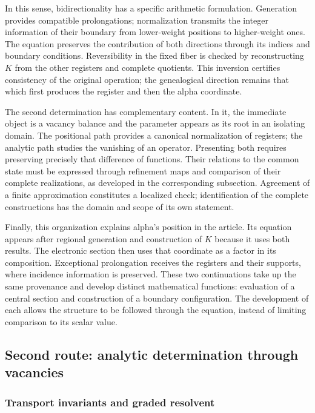 In this sense, bidirectionality has a specific arithmetic
formulation. Generation provides compatible prolongations;
normalization transmits the integer information of their boundary from
lower-weight positions to higher-weight ones. The equation preserves the
contribution of both directions through its indices and boundary
conditions. Reversibility in the fixed fiber is checked by reconstructing
$K$ from the other registers and complete quotients. This
inversion certifies consistency of the original operation; the genealogical
direction remains that which first produces the register and then
the alpha coordinate.

The second determination has complementary content. In it, the
immediate object is a vacancy balance and the parameter appears as
its root in an isolating domain. The positional path provides a
canonical normalization of registers; the analytic path studies the vanishing
of an operator. Presenting both requires preserving precisely
that difference of functions. Their relations to the common state must
be expressed through refinement maps and comparison of
their complete realizations, as developed in the corresponding
subsection. Agreement of a finite approximation constitutes a
localized check; identification of the complete constructions
has the domain and scope of its own statement.

Finally, this organization explains alpha's position in the article.
Its equation appears after regional generation and construction
of $K$ because it uses both results. The electronic section then uses
that coordinate as a factor in its composition. Exceptional prolongation
receives the registers and their supports, where incidence information is
preserved. These two continuations take up the same
provenance and develop distinct mathematical functions: evaluation of
a central section and construction of a boundary configuration.
The development of each allows the structure to be followed through the
equation, instead of limiting comparison to its scalar value.



\subsection{Second route: analytic determination through vacancies}
\subsubsection{Transport invariants and graded resolvent}
\label{x_reciprocidad:subsec:alpha-via-b}

